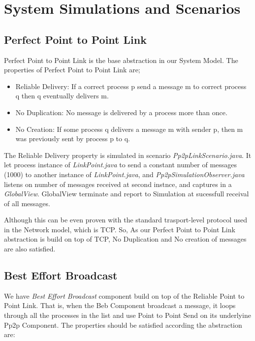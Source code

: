 \documentclass[a4paper, 11pt]{article}
\begin{document}
\section{System Simulations and Scenarios}

\subsection{Perfect Point to Point Link}
Perfect Point to Point Link is the base abstraction in our System Model. The properties of Perfect Point to Point Link are;
 
\begin{itemize}
	\item Reliable Delivery: If a correct process p send a message m to correct process q then q eventually delivers m.
	
	\item No Duplication: No message is delivered by a process more than once.
	
	\item No Creation: If some process q delivers a message m with sender p, then m was previously sent by process p to q.

\end{itemize}

The Reliable Delivery property is simulated in scenario \textit{Pp2pLinkScenario.java}. It let process instance of \textit{LinkPoint.java} to send a constant number of messages (1000) to another instance of \textit{LinkPoint.java}, and \textit{Pp2pSimulationObserver.java} listens on number of messages received at second instnce, and captures in a 
\textit{GlobalView}. GlobalView terminate and report to Simulation at sucessfull receival of all messages.

Although this can be even proven with the standard trasport-level protocol used in the Network model, which is TCP. 
So, As our Perfect Point to Point Link abstraction is build on top of TCP, No Duplication and No creation of messages are also satisfied.

\subsection{Best Effort Broadcast}
We have \textit{Best Effort Broadcast} component build on top of the 
Reliable Point to Point Link. That is, when the Beb Component broadcast a message, it loops through all the processes in the list and use Point to Point Send on its underlyine Pp2p Component.
The properties should be satisfied according the abstraction are:
\end{document}
